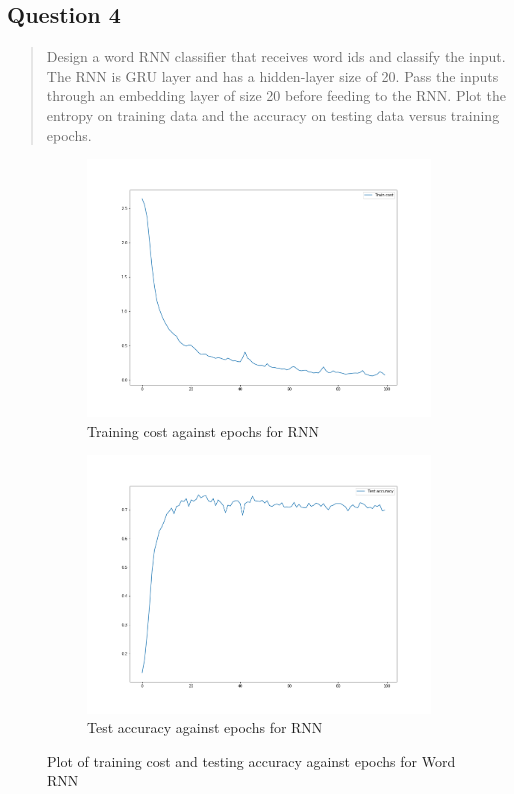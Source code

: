 \subsection{Question 4}
\label{2q4}
\begin{quote}
Design a word RNN classifier that receives word ids and classify the input. The RNN is GRU layer and has a hidden-layer size of 20. Pass the inputs through an embedding layer of size 20 before feeding to the RNN. Plot the entropy on training data and the accuracy on testing data versus training epochs.
\end{quote}
\begin{figure}[H]
    \begin{subfigure}{0.5\textwidth}
        \centering
        \includegraphics[width=1\linewidth]{assets/plots2/q3_1.png}
        \caption{Training cost against epochs for RNN}
    \end{subfigure}
    \begin{subfigure}{0.5\textwidth}
        \centering
        \includegraphics[width=1\linewidth]{assets/plots2/q3_2.png}
        \caption{Test accuracy against epochs for RNN}
    \end{subfigure}
    \caption{Plot of training cost and testing accuracy against epochs for Word RNN}
    \label{fig:2_4_1}
\end{figure}

